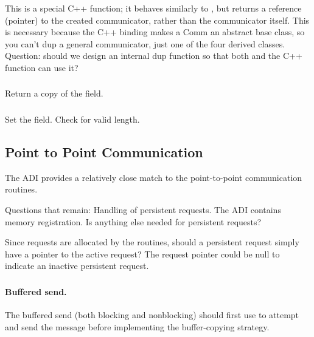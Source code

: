 \documentclass{article}
\begin{document}
\subsubsection{}
This is a special C++ function; it behaves similarly to
, but returns a reference (pointer) to the created
communicator, rather than the communicator itself.  This is necessary because
the C++ binding makes a Comm an abstract base class, so you can't dup a
general communicator, just one of the four derived classes.
Question: should we design an internal dup function so that both
 and the C++  function can use it?

\subsubsection{}
Return a copy of the  field.

\subsubsection{}
Set the  field.  Check for valid length.

\subsection{Point to Point Communication}

The ADI provides a relatively close match to the point-to-point
communication routines.  

Questions that remain:  Handling of persistent requests.  The ADI
contains memory registration.  Is anything else needed for persistent
requests? 

Since requests are allocated by the  routines,
should a persistent request simply have a pointer to the active request?  The
request pointer could be null to indicate an inactive persistent request.

\subsubsection{}
\begin{adi3}
\end{adi3}

\paragraph{Buffered send.}
The buffered send (both blocking and nonblocking) should first use
 to attempt 
and send the message before implementing the buffer-copying strategy.
\end{document}
